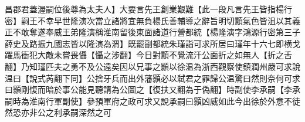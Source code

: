 昌郡君蓋渥嗣位後尊為太夫人】大要言先王創業艱難【此一段凡言先王皆指楊行密】嗣王不幸早世隆演次當立諸將宜無負楊氏善輔導之辭旨明切顥氣色皆沮以其義正不敢奪遂奉威王弟隆演稱淮南留後東面諸道行營都統【楊隆演字鴻源行密第三子薛史及路振九國志皆以隆演為渭】既罷副都統朱瑾詣可求所居曰瑾年十六七即横戈躍馬衝犯大敵未嘗畏懾【懾之涉翻】今日對顥不覺流汗公面折之如無人【折之舌翻】乃知瑾匹夫之勇不及公遠矣因以兄事之顥以徐温為浙西觀察使鎮潤州嚴可求說温曰【說式芮翻下同】公捨牙兵而出外藩顥必以弑君之罪歸公温驚曰然則奈何可求曰顥剛愎而暗於事公能見聽請為公圖之【復扶又翻為于偽翻】時副使李承嗣【李承嗣時為淮南行軍副使】參預軍府之政可求又說承嗣曰顥凶威如此今出徐於外意不徒然恐亦非公之利承嗣深然之可